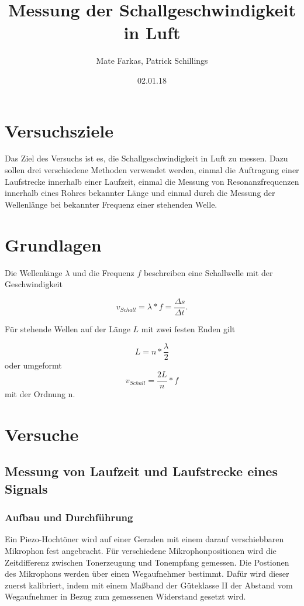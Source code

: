 \documentclass[]{article}
\title{Messung der Schallgeschwindigkeit in Luft}
\date{02.01.18}
\author{Mate Farkas, Patrick Schillings}
\begin{document}
	
	
	\tableofcontents
	
	\noindent\makebox[\linewidth]{\rule{\textwidth}{0.4pt}}
	
	\section{Versuchsziele}
	
	Das Ziel des Versuchs ist es, die Schallgeschwindigkeit in Luft zu messen. Dazu sollen drei verschiedene Methoden verwendet werden, einmal die Auftragung einer Laufstrecke innerhalb einer Laufzeit, einmal die Messung von Resonanzfrequenzen innerhalb eines Rohres bekannter Länge und einmal durch die Messung der Wellenlänge bei bekannter Frequenz einer stehenden Welle.
	
	\section{Grundlagen} %
	
	Die Wellenlänge $\lambda$ und die Frequenz $f$ beschreiben eine Schallwelle mit der Geschwindigkeit
	
	\begin{equation}
		v_{Schall}=\lambda*f=\frac{\Delta s}{\Delta t}.
		\label{e1}
	\end{equation}
	
	Für stehende Wellen auf der Länge $L$ mit zwei festen Enden gilt
	
	\begin{equation}
		L=n*\frac{\lambda}{2}
		\label{e2}
	\end{equation}
	oder umgeformt
	\begin{equation}
	v_{Schall}=\frac{2L}{n}*f
	\label{e3} 
	\end{equation}	
	mit der Ordnung n.
	
	
	\section{Versuche}
	
	\subsection{Messung von Laufzeit und Laufstrecke eines Signals}
	\subsubsection{Aufbau und Durchführung}
	Ein Piezo-Hochtöner wird auf einer Geraden mit einem darauf verschiebbaren Mikrophon fest angebracht. Für verschiedene Mikrophonpositionen wird die Zeitdifferenz zwischen Tonerzeugung und Tonempfang gemessen. Die Postionen des Mikrophons werden über einen Wegaufnehmer bestimmt.
	Dafür wird dieser zuerst kalibriert, indem mit einem Maßband der Güteklasse II der Abstand vom Wegaufnehmer in Bezug zum gemessenen Widerstand gesetzt wird. 
	
\end{document}
